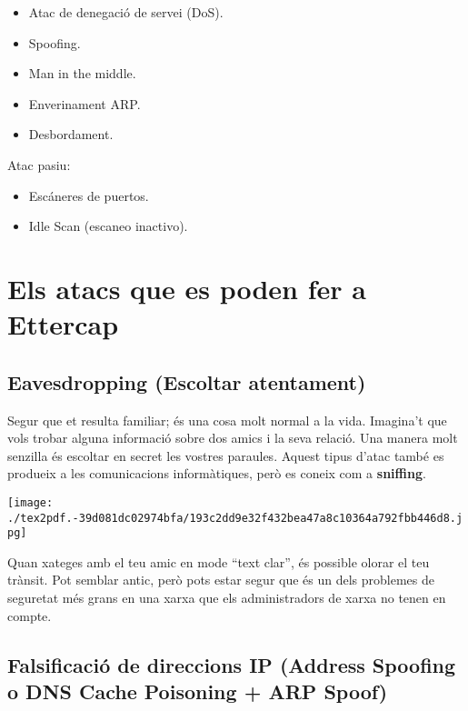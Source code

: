 \documentclass[]{article}
\begin{document}
\begin{itemize}
\item
  Atac de denegació de servei (DoS).
\item
  Spoofing.
\item
  Man in the middle.
\item
  Enverinament ARP.
\item
  Desbordament.
\end{itemize}

Atac pasiu:

\begin{itemize}
\item
  Escáneres de puertos.
\item
  Idle Scan (escaneo inactivo).
\end{itemize}

\hypertarget{els-atacs-que-es-poden-fer-a-ettercap}{%
\section{\texorpdfstring{\textbf{Els atacs que es poden fer a
Ettercap}}{Els atacs que es poden fer a Ettercap}}\label{els-atacs-que-es-poden-fer-a-ettercap}}

\hypertarget{eavesdropping-escoltar-atentament}{%
\subsection{\texorpdfstring{\textbf{Eavesdropping (Escoltar
atentament)}}{Eavesdropping (Escoltar atentament)}}\label{eavesdropping-escoltar-atentament}}

Segur que et resulta familiar; és una cosa molt normal a la vida.
Imagina't que vols trobar alguna informació sobre dos amics i la seva
relació. Una manera molt senzilla és escoltar en secret les vostres
paraules. Aquest tipus d'atac també es produeix a les comunicacions
informàtiques, però es coneix com a \textbf{sniffing}.

\texttt{[image: ./tex2pdf.-39d081dc02974bfa/193c2dd9e32f432bea47a8c10364a792fbb446d8.jpg]}

Quan xateges amb el teu amic en mode ``text clar'', és possible olorar
el teu trànsit. Pot semblar antic, però pots estar segur que és un dels
problemes de seguretat més grans en una xarxa que els administradors de
xarxa no tenen en compte.

\hypertarget{falsificaciuxf3-de-direccions-ip-address-spoofing-o-dns-cache-poisoning-arp-spoof}{%
\subsection{\texorpdfstring{\textbf{Falsificació de direccions IP
(Address Spoofing o DNS Cache Poisoning + ARP
Spoof)}}{Falsificació de direccions IP (Address Spoofing o DNS Cache Poisoning + ARP Spoof)}}\label{falsificaciuxf3-de-direccions-ip-address-spoofing-o-dns-cache-poisoning-arp-spoof}}
\end{document}
